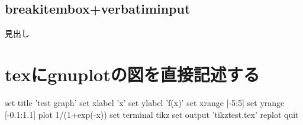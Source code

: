 \documentclass[a4j,titlepage,dvipdfmx]{jsarticle}   %
\begin{document}
\subsection{breakitembox+verbatiminput}
\begin{breakitembox}[l]{見出し}
   
\end{breakitembox}

\section{texにgnuplotの図を直接記述する}
\begin{shellcode}
  set title 'test graph'
  set xlabel 'x'
  set ylabel 'f(x)'
  set xrange [-5:5]
  set yrange [-0.1:1.1]
  plot 1/(1+exp(-x))
  set terminal tikz
  set output 'tikztest.tex'
  replot
  quit
\end{shellcode}
\centering

\end{document}
